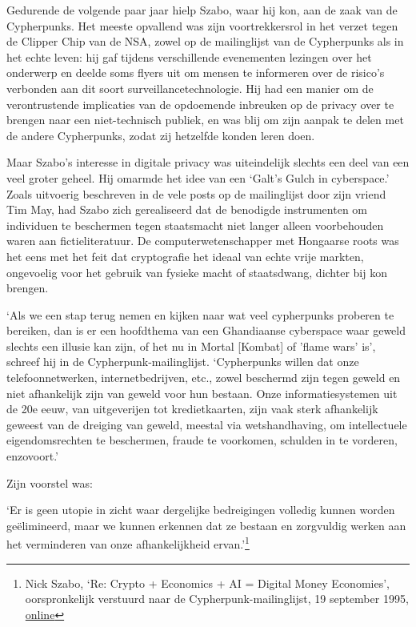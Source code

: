 \documentclass[smalldemyvopaper,11pt,twoside,onecolumn,openright,extrafontsizes,hidelinks]{memoir}
\begin{document}
Gedurende de volgende paar jaar hielp Szabo, waar hij kon, aan de zaak
van de Cypherpunks. Het meeste opvallend was zijn voortrekkersrol in het
verzet tegen de Clipper Chip van de NSA, zowel op de mailinglijst van de
Cypherpunks als in het echte leven: hij gaf tijdens verschillende
evenementen lezingen over het onderwerp en deelde soms flyers uit om
mensen te informeren over de risico's verbonden aan dit soort
surveillancetechnologie. Hij had een manier om de verontrustende
implicaties van de opdoemende inbreuken op de privacy over te brengen
naar een niet-technisch publiek, en was blij om zijn aanpak te delen met
de andere Cypherpunks, zodat zij hetzelfde konden leren doen.

Maar Szabo's interesse in digitale privacy was uiteindelijk slechts een
deel van een veel groter geheel. Hij omarmde het idee van een `Galt's
Gulch in cyberspace.' Zoals uitvoerig beschreven in de vele posts op de
mailinglijst door zijn vriend Tim May, had Szabo zich gerealiseerd dat
de benodigde instrumenten om individuen te beschermen tegen staatsmacht
niet langer alleen voorbehouden waren aan fictieliteratuur. De
computerwetenschapper met Hongaarse roots was het eens met het feit dat
cryptografie het ideaal van echte vrije markten, ongevoelig voor het
gebruik van fysieke macht of staatsdwang, dichter bij kon brengen.

`Als we een stap terug nemen en kijken naar wat veel cypherpunks
proberen te bereiken, dan is er een hoofdthema van een Ghandiaanse
cyberspace waar geweld slechts een illusie kan zijn, of het nu in Mortal
{[}Kombat{]} of 'flame wars' is', schreef hij in de
Cypherpunk-mailinglijst. `Cypherpunks willen dat onze telefoonnetwerken,
internetbedrijven, etc., zowel beschermd zijn tegen geweld en niet
afhankelijk zijn van geweld voor hun bestaan. Onze informatiesystemen
uit de 20e eeuw, van uitgeverijen tot kredietkaarten, zijn vaak sterk
afhankelijk geweest van de dreiging van geweld, meestal via
wetshandhaving, om intellectuele eigendomsrechten te beschermen, fraude
te voorkomen, schulden in te vorderen, enzovoort.'

Zijn voorstel was:

`Er is geen utopie in zicht waar dergelijke bedreigingen volledig kunnen
worden geëlimineerd, maar we kunnen erkennen dat ze bestaan en
zorgvuldig werken aan het verminderen van onze afhankelijkheid
ervan.'\footnote{Nick Szabo, `Re: Crypto + Economics + AI = Digital
  Money Economies', oorspronkelijk verstuurd naar de
  Cypherpunk-mailinglijst, 19 september 1995,
  \href{https://cypherpunks.venona.com/date/1995/09/msg01303.html}{online}}
\end{document}
